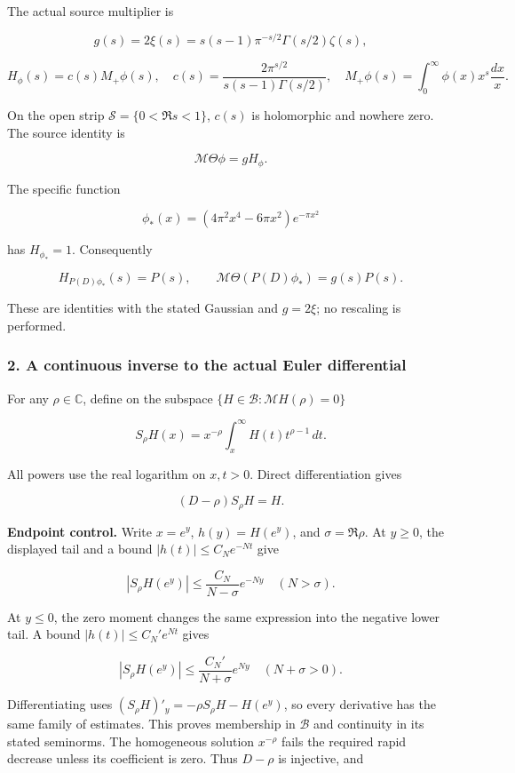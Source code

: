 The actual source multiplier is

\[g(s)=2\xi(s)=s(s-1)\pi^{-s/2}\Gamma(s/2)\zeta(s),\]

\[H_\phi(s)=c(s)M_+\phi(s),\quad
c(s)=\frac{2\pi^{s/2}}{s(s-1)\Gamma(s/2)},\quad
M_+\phi(s)=\int_0^\infty\phi(x)x^s\frac{dx}{x}.\]

On the open strip \(\mathscr S=\{0<\Re s<1\}\), \(c(s)\) is holomorphic and nowhere zero. The source
identity is

\[\mathcal M\Theta\phi=gH_\phi.\]

The specific function

\[\phi_*(x)=(4\pi^2x^4-6\pi x^2)e^{-\pi x^2}\]

has \(H_{\phi_*}=1\). Consequently

\[H_{P(D)\phi_*}(s)=P(s),\qquad
\mathcal M\Theta(P(D)\phi_*)=g(s)P(s).\]

These are identities with the stated Gaussian and \(g=2\xi\); no rescaling is performed.

\subsubsection{2. A continuous inverse to the actual Euler
differential}\label{pr_8:a-continuous-inverse-to-the-actual-euler-differential}

For any \(\rho\in\mathbb C\), define on the subspace \(\{H\in\mathscr B:\mathcal MH(\rho)=0\}\)

\[\boxed{S_\rho H(x)=x^{-\rho}\int_x^\infty H(t)t^{\rho-1}\,dt.}\]

All powers use the real logarithm on \(x,t>0\). Direct differentiation gives

\[(D-\rho)S_\rho H=H.\]

\textbf{Endpoint control.} Write \(x=e^y\), \(h(y)=H(e^y)\), and \(\sigma=\Re\rho\). At \(y\ge0\),
the displayed tail and a bound \(|h(t)|\le C_Ne^{-Nt}\) give

\[|S_\rho H(e^y)|\le\frac{C_N}{N-\sigma}e^{-Ny}\quad(N>\sigma).\]

At \(y\le0\), the zero moment changes the same expression into the negative lower tail. A bound
\(|h(t)|\le C_N'e^{Nt}\) gives

\[|S_\rho H(e^y)|\le\frac{C_N'}{N+\sigma}e^{Ny}\quad(N+\sigma>0).\]

Differentiating uses \((S_\rho H)'_y=-\rho S_\rho H-H(e^y)\), so every derivative has the same
family of estimates. This proves membership in \(\mathscr B\) and continuity in its stated
seminorms. The homogeneous solution \(x^{-\rho}\) fails the required rapid decrease unless its
coefficient is zero. Thus \(D-\rho\) is injective, and


